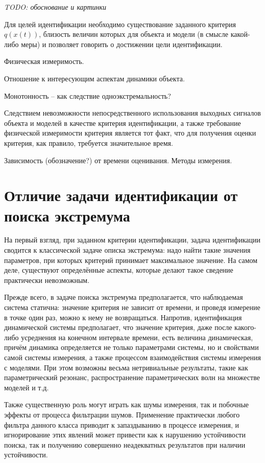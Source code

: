 \textit{TODO: обоснование и картинки}

Для целей идентификации необходимо существование
заданного критерия $q(x(t))$, близость величин
которых для объекта и модели (в смысле какой-либо меры)
и позволяет говорить о достижении цели идентификации.


Физическая измеримость.

Отношение к интересующим аспектам динамики объекта.

Монотонность -- как следствие одноэкстремальность?

Следствием невозможности непосредственного использования выходных
сигналов объекта и моделей в качестве критерия идентификации, а также
требование физической измеримости критерия является
тот факт, что для получения оценки критерия, как правило,
требуется значительное время.

Зависимость (обозначение?) от времени оценивания.
Методы измерения.






\section{Отличие задачи идентификации от поиска экстремума}

На первый взгляд, при заданном критерии идентификации, задача идентификации
сводится к классической задаче описка экстремума: надо найти такие значения
параметров, при которых критерий принимает максимальное значение.
На самом деле, существуют определённые аспекты, которые делают такое
сведение практически невозможным.

Прежде всего, в задаче поиска
экстремума предполагается, что наблюдаемая система статична:
значение критерия не зависит от времени, и проведя измерение
в точке один раз, можно к нему не возвращаться.
Напротив, идентификация динамической системы предполагает,
что значение критерия, даже после какого-либо усреднения на конечном
интервале времени, есть величина динамическая, причём динамика определяется
не только параметрами системы, но и свойствами самой системы измерения,
а также процессом взаимодействия системы измерения с моделями. При этом
возможны весьма нетривиальные результаты, такие как параметрический
резонанс, распространение параметрических волн на множестве моделей и т.д.

Также существенную роль могут играть как шумы измерения, так и побочные
эффекты от процесса фильтрации шумов.
Применение практически любого фильтра данного класса приводит к запаздыванию
в процессе измерения, и игнорирование этих явлений может привести
как к нарушению устойчивости поиска, так и получению совершенно
неадекватных результатов при наличии устойчивости.

